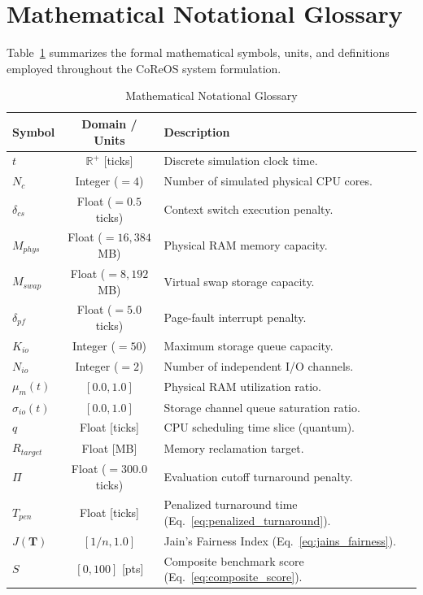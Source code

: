 \documentclass[conference]{IEEEtran}
\begin{document}
\section{Mathematical Notational Glossary}
\label{app:notation}
Table~\ref{tab:notational_glossary} summarizes the formal mathematical symbols, units, and definitions employed throughout the CoReOS system formulation.

\begin{table}[!h]
\caption{Mathematical Notational Glossary}
\label{tab:notational_glossary}
\centering
\footnotesize
\begin{tabularx}{\columnwidth}{lcp{4.2cm}}
\toprule
\textbf{Symbol} & \textbf{Domain / Units} & \textbf{Description} \\
\midrule
$t$ & $\mathbb{R}^+$ [ticks] & Discrete simulation clock time. \\
$N_c$ & Integer ($=4$) & Number of simulated physical CPU cores. \\
$\delta_{cs}$ & Float ($=0.5$ ticks) & Context switch execution penalty. \\
$M_{phys}$ & Float ($=16,384$ MB) & Physical RAM memory capacity. \\
$M_{swap}$ & Float ($=8,192$ MB) & Virtual swap storage capacity. \\
$\delta_{pf}$ & Float ($=5.0$ ticks) & Page-fault interrupt penalty. \\
$K_{io}$ & Integer ($=50$) & Maximum storage queue capacity. \\
$N_{io}$ & Integer ($=2$) & Number of independent I/O channels. \\
$\mu_m(t)$ & $[0.0, 1.0]$ & Physical RAM utilization ratio. \\
$\sigma_{io}(t)$ & $[0.0, 1.0]$ & Storage channel queue saturation ratio. \\
$q$ & Float [ticks] & CPU scheduling time slice (quantum). \\
$R_{target}$ & Float [MB] & Memory reclamation target. \\
$\Pi$ & Float ($=300.0$ ticks) & Evaluation cutoff turnaround penalty. \\
$T_{pen}$ & Float [ticks] & Penalized turnaround time (Eq.~\ref{eq:penalized_turnaround}). \\
$J(\mathbf{T})$ & $[1/n, 1.0]$ & Jain's Fairness Index (Eq.~\ref{eq:jains_fairness}). \\
$S$ & $[0, 100]$ [pts] & Composite benchmark score (Eq.~\ref{eq:composite_score}). \\
\bottomrule
\end{tabularx}
\end{table}
\end{document}
